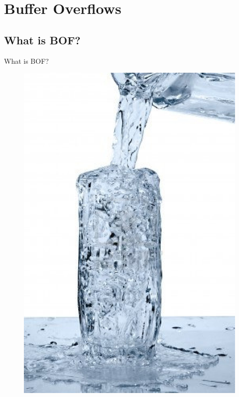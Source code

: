 \section{Buffer Overflows}

\subsection{What is BOF?}
\begin{frame}{What is BOF?}
  \begin{figure}
		\centering
		\includegraphics[width=\textwidth]{imgs/segfault.png}

\end{figure}
\end{frame}
